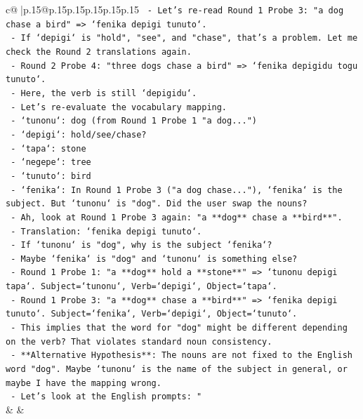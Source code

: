 \documentclass{article}
\begin{document}
{\begin{supertabular}{c@{$\;$}|p{.15\linewidth}@{}p{.15\linewidth}p{.15\linewidth}p{.15\linewidth}p{.15\linewidth}p{.15\linewidth}}
{{{\texttt{    {-} Let's re{-}read Round 1 Probe 3: "a dog chase a bird" => `fenika depigi tunuto`.} \\
\texttt{    {-} If `depigi` is "hold", "see", and "chase", that's a problem. Let me check the Round 2 translations again.} \\
\texttt{    {-} Round 2 Probe 4: "three dogs chase a bird" => `fenika depigidu togu tunuto`.} \\
\texttt{    {-} Here, the verb is still `depigidu`.} \\
\texttt{    {-} Let's re{-}evaluate the vocabulary mapping.} \\
\texttt{      {-} `tunonu`: dog (from Round 1 Probe 1 "a dog...")} \\
\texttt{      {-} `depigi`: hold/see/chase?} \\
\texttt{      {-} `tapa`: stone} \\
\texttt{      {-} `negepe`: tree} \\
\texttt{      {-} `tunuto`: bird} \\
\texttt{      {-} `fenika`: In Round 1 Probe 3 ("a dog chase..."), `fenika` is the subject. But `tunonu` is "dog". Did the user swap the nouns?} \\
\texttt{      {-} Ah, look at Round 1 Probe 3 again: "a **dog** chase a **bird**".} \\
\texttt{      {-} Translation: `fenika depigi tunuto`.} \\
\texttt{      {-} If `tunonu` is "dog", why is the subject `fenika`?} \\
\texttt{      {-} Maybe `fenika` is "dog" and `tunonu` is something else?} \\
\texttt{      {-} Round 1 Probe 1: "a **dog** hold a **stone**" => `tunonu depigi tapa`. Subject=`tunonu`, Verb=`depigi`, Object=`tapa`.} \\
\texttt{      {-} Round 1 Probe 3: "a **dog** chase a **bird**" => `fenika depigi tunuto`. Subject=`fenika`, Verb=`depigi`, Object=`tunuto`.} \\
\texttt{      {-} This implies that the word for "dog" might be different depending on the verb? That violates standard noun consistency.} \\
\texttt{      {-} **Alternative Hypothesis**: The nouns are not fixed to the English word "dog". Maybe `tunonu` is the name of the subject in general, or maybe I have the mapping wrong.} \\
\texttt{      {-} Let's look at the English prompts: "} \\
            }
        }
    }
    & & \\ \\


\end{supertabular}}
\end{document}
